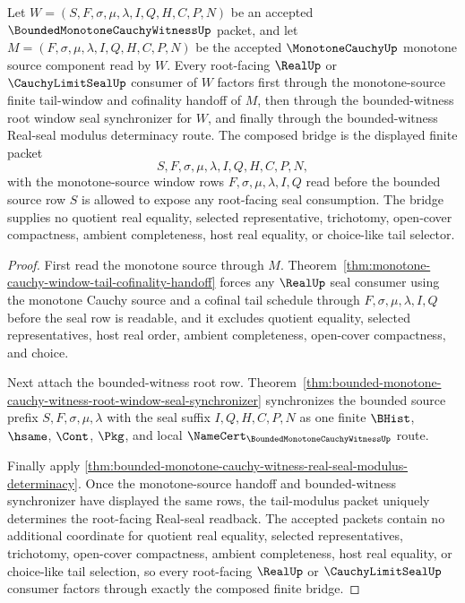 \begin{theorem}
\label{thm:bounded-monotone-cauchy-witness-monotone-source-seal-bridge}
Let $W=(S,F,\sigma,\mu,\lambda,I,Q,H,C,P,N)$ be an accepted $\BoundedMonotoneCauchyWitnessUp$ packet, and let $M=(F,\sigma,\mu,\lambda,I,Q,H,C,P,N)$ be the accepted $\MonotoneCauchyUp$ monotone source component read by $W$. Every root-facing $\RealUp$ or $\CauchyLimitSealUp$ consumer of $W$ factors first through the monotone-source finite tail-window and cofinality handoff of $M$, then through the bounded-witness root window seal synchronizer for $W$, and finally through the bounded-witness Real-seal modulus determinacy route. The composed bridge is the displayed finite packet
$$
S,F,\sigma,\mu,\lambda,I,Q,H,C,P,N,
$$
with the monotone-source window rows $F,\sigma,\mu,\lambda,I,Q$ read before the bounded source row $S$ is allowed to expose any root-facing seal consumption. The bridge supplies no quotient real equality, selected representative, trichotomy, open-cover compactness, ambient completeness, host real equality, or choice-like tail selector.
\end{theorem}
\begin{proof}
First read the monotone source through $M$. Theorem~\ref{thm:monotone-cauchy-window-tail-cofinality-handoff} forces any $\RealUp$ seal consumer using the monotone Cauchy source and a cofinal tail schedule through $F,\sigma,\mu,\lambda,I,Q$ before the seal row is readable, and it excludes quotient equality, selected representatives, host real order, ambient completeness, open-cover compactness, and choice.

Next attach the bounded-witness root row. Theorem~\ref{thm:bounded-monotone-cauchy-witness-root-window-seal-synchronizer} synchronizes the bounded source prefix $S,F,\sigma,\mu,\lambda$ with the seal suffix $I,Q,H,C,P,N$ as one finite $\BHist$, $\hsame$, $\Cont$, $\Pkg$, and local $\NameCert_{\BoundedMonotoneCauchyWitnessUp}$ route.

Finally apply \autoref{thm:bounded-monotone-cauchy-witness-real-seal-modulus-determinacy}. Once the monotone-source handoff and bounded-witness synchronizer have displayed the same rows, the tail-modulus packet uniquely determines the root-facing Real-seal readback. The accepted packets contain no additional coordinate for quotient real equality, selected representatives, trichotomy, open-cover compactness, ambient completeness, host real equality, or choice-like tail selection, so every root-facing $\RealUp$ or $\CauchyLimitSealUp$ consumer factors through exactly the composed finite bridge.
\end{proof}

